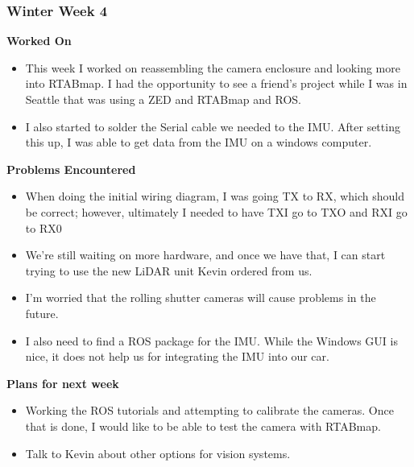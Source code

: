 \documentclass[compsoc,draftclsnofoot,onecolumn,10pt]{IEEEtran}
\begin{document}
\subsubsection*{Winter Week 4}
\textbf{Worked On}
\begin{itemize}
    \item This week I worked on reassembling the camera enclosure and looking more into RTABmap.
    I had the opportunity to see a friend's project while I was in Seattle that was using a ZED and RTABmap and ROS.
    \item I also started to solder the Serial cable we needed to the IMU.
    After setting this up, I was able to get data from the IMU on a windows computer.
\end{itemize}
\textbf{Problems Encountered}
\begin{itemize}
    \item When doing the initial wiring diagram, I was going TX to RX, which should be correct; however, ultimately I needed to have TXI go to TXO and RXI go to RX0
    \item We're still waiting on more hardware, and once we have that, I can start trying to use the new LiDAR unit Kevin ordered from us.
    \item I'm worried that the rolling shutter cameras will cause problems in the future.
    \item I also need to find a ROS package for the IMU. While the Windows GUI is nice, it does not help us for integrating the IMU into our car.
\end{itemize}
\textbf{Plans for next week}
\begin{itemize}
    \item Working the ROS tutorials and attempting to calibrate the cameras. Once that is done, I would like to be able to test the camera with RTABmap.
    \item Talk to Kevin about other options for vision systems.
\end{itemize}
\end{document}
